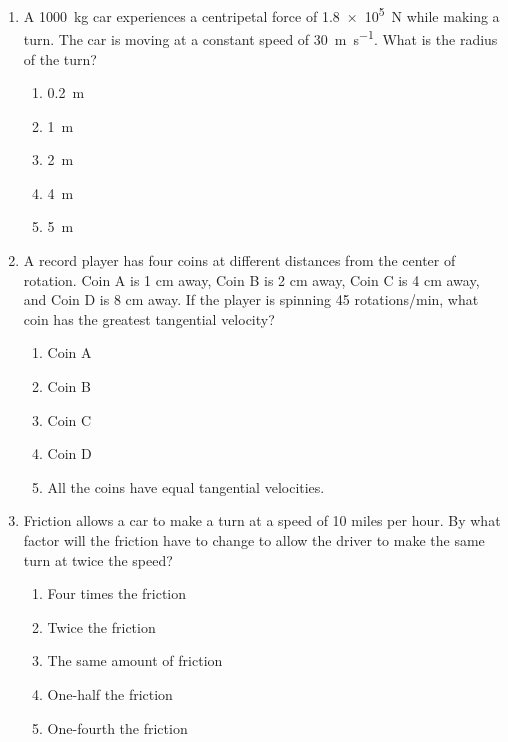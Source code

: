 \documentclass{../../../oss-classkick}
\begin{document}
\genheader


\genmultidirections

\gengravity

\raggedcolumns
\begin{multicols}{2}

  \begin{enumerate}[leftmargin=18pt]

  \item A \SI{1000}{\kilo\gram} car experiences a centripetal force of
    \SI{1.8e5}{\newton} while making a turn. The car is moving at a constant
    speed of \SI{30}{\metre\per\second}. What is the radius of the turn?
    \begin{enumerate}[nosep,leftmargin=18pt,label=(\Alph*)]
    \item\SI{.2}{\metre}
    \item\SI{1}{\metre}
    \item\SI{2}{\metre}
    \item\SI{4}{\metre}
    \item\SI{5}{\metre}
    \end{enumerate}

  \item A record player has four coins at different distances from the center of
    rotation. Coin A is 1 cm away, Coin B is 2 cm away, Coin C is 4 cm away,
    and Coin D is 8 cm away. If the player is spinning 45 rotations/min, what
    coin has the greatest tangential velocity?
    \begin{enumerate}[nosep,leftmargin=18pt,label=(\Alph*)]
    \item Coin A
    \item Coin B
    \item Coin C
    \item Coin D
    \item All the coins have equal tangential velocities.
    \end{enumerate}
    \vspace{.7in}
    
  \item Friction allows a car to make a turn at a speed of 10 miles per hour. By
    what factor will the friction have to change to allow the driver to make the
    same turn at twice the speed?
    \begin{enumerate}[nosep,leftmargin=18pt,label=(\Alph*)]
    \item Four times the friction
    \item Twice the friction
    \item The same amount of friction
    \item One-half the friction
    \item One-fourth the friction
    \end{enumerate}
    \vspace{.7in}
    

\end{enumerate}
\end{multicols}
\end{document}
